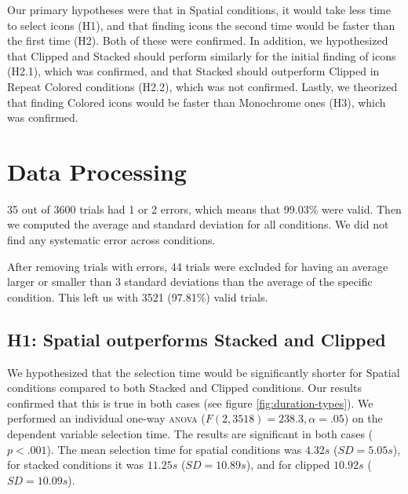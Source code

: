 \documentclass[nobib]{tufte-book} %
\begin{document}
Our primary hypotheses were that in Spatial conditions, it would take less time to select icons (H1), and that finding icons the second time would be faster than the first time (H2). Both of these were confirmed. In addition, we hypothesized that Clipped and Stacked should perform similarly for the initial finding of icons (H2.1), which was confirmed, and that Stacked should outperform Clipped in Repeat Colored conditions (H2.2), which was not confirmed.
Lastly, we theorized that finding Colored icons would be faster than Monochrome ones (H3), which was confirmed.

\section{Data Processing}
35 out of 3600 trials had 1 or 2 errors, which means that 99.03\% were valid. Then we computed the average and standard deviation for all conditions. We did not find any systematic error across conditions.

After removing trials with errors, 44 trials were excluded for having an average larger or smaller than 3 standard deviations than the average of the specific condition. This left us with 3521 (97.81\%) valid trials.

\subsection{H1: Spatial outperforms Stacked and Clipped}
We hypothesized that the selection time would be significantly shorter for Spatial conditions compared to both Stacked and Clipped conditions. Our results confirmed that this is true in both cases (see figure \ref{fig:duration-types}). We performed an individual one-way \textsc{anova} ($F(2,3518) = 238.3, \alpha = .05$) on the dependent variable selection time. The results are significant in both cases ($p < .001$). The mean selection time for spatial conditions was $4.32 s$ ($SD = 5.05 s$), for stacked conditions it was $11.25 s$ ($SD = 10.89 s$), and for clipped $10.92 s$ ($SD = 10.09 s$).
\end{document}
